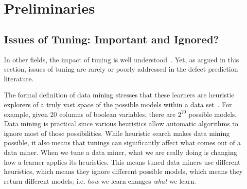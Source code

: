 \documentclass{sig-alternative}
\begin{document}


\section{Preliminaries}
\subsection{Issues of Tuning: Important and Ignored?}
In  other fields, the impact of tuning is well understood~\cite{Bergstra2012}. 
Yet, as argued in this section, issues of tuning  are rarely or poorly addressed
in the defect prediction literature.

The formal definition of data mining stresses that these learners are heuristic explorers
of a truly   vast space of the possible models within a data set~\cite{mitchell1982generalization}. For example, given 20 columns of boolean variables,
there are $2^{20}$ possible models. Data mining is practical since various heuristics
allow automatic algorithms to ignore most of those possibilities. While heuristic search makes data mining possible, it also means that tunings
can significantly affect what comes out of a data miner.
When we tune a data miner, what we are really doing is changing how a learner applies
its heuristics. This means tuned data miners use different heuristics, which means they ignore different possible models, which means they return different models; i.e.  {\em how} we learn changes {\em what} we learn.
\end{document}
